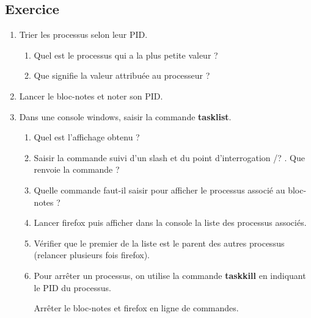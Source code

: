 \documentclass[11pt,a4paper]{article}
\newcounter{numexo}
\begin{document}
\addtocounter{numexo}{1}
\subsection*{\Large Exercice \thenumexo}
\begin{enumerate}
\item Trier les processus selon leur PID.\begin{enumerate}
\item Quel est le processus qui a la plus petite valeur ?
\item Que signifie la valeur attribuée au processeur ?
\end{enumerate}

\item Lancer le bloc-notes et noter son PID.

\item Dans une console windows, saisir la commande \textbf{tasklist}.
\begin{enumerate}
\item Quel est l'affichage obtenu ?
\item Saisir la commande suivi d'un slash et du point d'interrogation /? . Que renvoie la commande ?
\item Quelle commande faut-il saisir pour afficher le processus associé au bloc-notes ?
\item Lancer firefox puis afficher dans la console la liste des processus associés.
\item Vérifier que le premier de la liste est le parent des autres processus (relancer plusieurs fois firefox).
\item Pour arrêter un processus, on utilise la commande \textbf{taskkill} en indiquant le PID du processus.

Arrêter le bloc-notes et firefox en ligne de commandes.
\end{enumerate}
\end{enumerate}


\addtocounter{numexo}{1}
\end{document}
